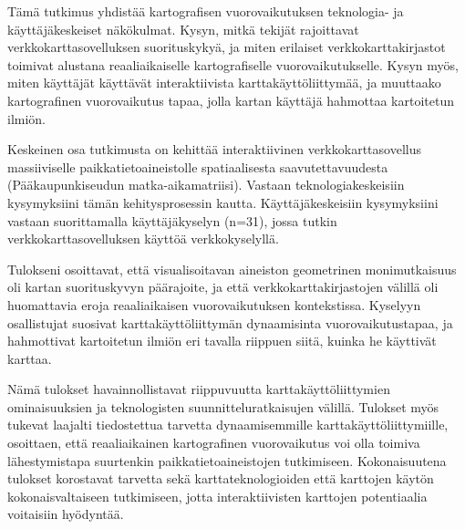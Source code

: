 \begin{spacing}{1}
Tämä tutkimus yhdistää kartografisen vuorovaikutuksen teknologia- ja käyttäjäkeskeiset näkökulmat.
Kysyn, mitkä tekijät rajoittavat verkkokarttasovelluksen suorituskykyä,
ja miten erilaiset verkkokarttakirjastot toimivat alustana reaaliaikaiselle kartografiselle vuorovaikutukselle.
Kysyn myös, miten käyttäjät käyttävät interaktiivista karttakäyttöliittymää,
ja muuttaako kartografinen vuorovaikutus tapaa, jolla kartan käyttäjä hahmottaa kartoitetun ilmiön.

Keskeinen osa tutkimusta on kehittää interaktiivinen verkkokarttasovellus
massiiviselle paikkatietoaineistolle spatiaalisesta saavutettavuudesta (Pääkaupunkiseudun matka-aikamatriisi).
Vastaan teknologiakeskeisiin kysymyksiini tämän kehitysprosessin kautta.
Käyttäjäkeskeisiin kysymyksiini vastaan suorittamalla käyttäjäkyselyn (n=31),
jossa tutkin verkkokarttasovelluksen käyttöä verkkokyselyllä.

Tulokseni osoittavat, että visualisoitavan aineiston geometrinen monimutkaisuus
oli kartan suorituskyvyn päärajoite, ja että verkkokarttakirjastojen välillä oli
huomattavia eroja reaaliaikaisen vuorovaikutuksen kontekstissa.
Kyselyyn osallistujat suosivat karttakäyttöliittymän dynaamisinta vuorovaikutustapaa,
ja hahmottivat kartoitetun ilmiön eri tavalla riippuen siitä, kuinka he käyttivät karttaa.

Nämä tulokset havainnollistavat riippuvuutta karttakäyttöliittymien ominaisuuksien
ja teknologisten suunnitteluratkaisujen välillä.
Tulokset myös tukevat laajalti tiedostettua tarvetta dynaamisemmille karttakäyttöliittymiille,
osoittaen, että reaaliaikainen kartografinen vuorovaikutus voi olla toimiva lähestymistapa suurtenkin
paikkatietoaineistojen tutkimiseen.
Kokonaisuutena tulokset korostavat tarvetta
sekä karttateknologioiden että karttojen käytön kokonaisvaltaiseen tutkimiseen,
jotta interaktiivisten karttojen potentiaalia voitaisiin hyödyntää.

\end{spacing}
